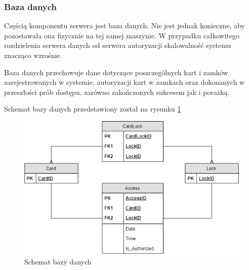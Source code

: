                         \subsubsection{Baza danych}
                                Częścią komponentu serwera jest baza danych. Nie jest jednak konieczne, aby pozostawała ona fizycznie na tej samej maszynie. W przypadku całkowitego rozdzielenia serwera danych od serwera autoryzacji skalowalność systemu znacząco wzrośnie.

                                Baza danych przechowuje dane dotyczące poszczególnych kart i zamków zarejestrowanych w systemie, autoryzacji kart w zamkach oraz dokonanych w przeszłości prób dostępu, zarówno zakończonych sukcesem jak i porażką.

                                Schemat bazy danych przedstawiony został na rysunku \ref{fig:schema}

                                \begin{figure}
                                        \includegraphics[width=\linewidth]{chapters/images/schema.png}
                                        \caption{Schemat bazy danych}
                                        \label{fig:schema}
                                \end{figure}

